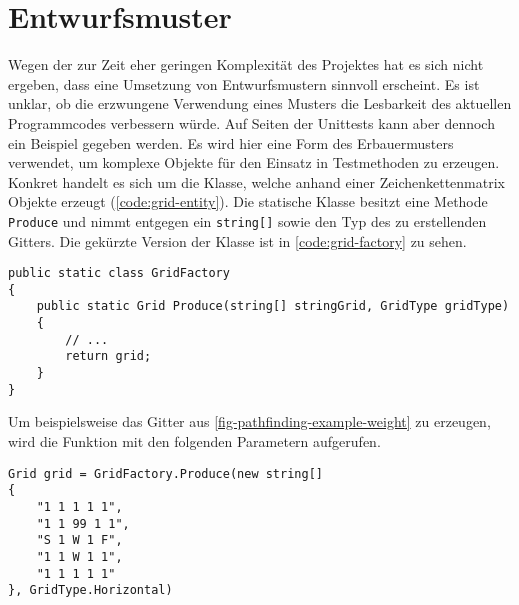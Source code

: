 \part{Entwurfsmuster}
Wegen der zur Zeit eher geringen Komplexität des Projektes hat es sich
nicht ergeben, dass eine Umsetzung von Entwurfsmustern sinnvoll erscheint.
Es ist unklar, ob die erzwungene Verwendung eines Musters
die Lesbarkeit des aktuellen Programmcodes verbessern würde.
Auf Seiten der Unittests kann aber dennoch ein Beispiel gegeben werden.
Es wird hier eine Form des Erbauermusters verwendet, um
komplexe Objekte für den Einsatz in Testmethoden zu erzeugen.
Konkret handelt es sich um die 
Klasse, welche anhand einer Zeichenkettenmatrix 
Objekte erzeugt (\ref{code:grid-entity}).
Die statische Klasse besitzt eine Methode \lstinline{Produce}
und nimmt entgegen ein \lstinline{string[]} sowie den Typ des
zu erstellenden Gitters. Die gekürzte Version der Klasse ist in
\autoref{code:grid-factory} zu sehen.
\begin{lstlisting}[caption={{\inlinecode[\colorClasses]{GridFactory}} Klasse},
  label={code:grid-factory}]
public static class GridFactory
{
    public static Grid Produce(string[] stringGrid, GridType gridType)
    {
        // ...
        return grid;
    }
}
\end{lstlisting}
Um beispielsweise das Gitter aus \autoref{fig-pathfinding-example-weight}
zu erzeugen, wird die Funktion mit den folgenden Parametern aufgerufen.
\begin{lstlisting}[caption={Erzeugen eines Gitters durch
  die \lstinline{GridFactory} Klasse}, label={code:grid-factory-example}]
Grid grid = GridFactory.Produce(new string[]
{
    "1 1 1 1 1",
    "1 1 99 1 1",
    "S 1 W 1 F",
    "1 1 W 1 1",
    "1 1 1 1 1"
}, GridType.Horizontal)
\end{lstlisting}